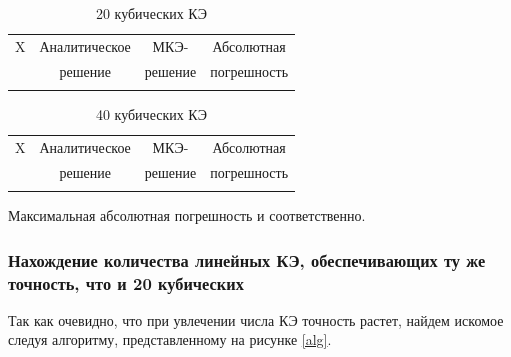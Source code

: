 \begin{table}[H]
\centering
\begin{tabular}{|c|c|c|c|}
\hline
X & Аналитическое & МКЭ-    & Абсолютная \\
  & решение       & решение & погрешность \\
\hline
 \\
\hline
\end{tabular}
\caption{20 кубических КЭ}
\label{table:lin_20}
\end{table}

\begin{table}[H]
\centering
\begin{tabular}{|c|c|c|c|}
\hline
X & Аналитическое & МКЭ-    & Абсолютная \\
  & решение       & решение & погрешность \\
\hline
 \\
\hline
\end{tabular}
\caption{40 кубических КЭ}
\label{table:lin_40}
\end{table}

Максимальная абсолютная погрешность  и  соответственно.


\subsubsection{Нахождение количества линейных КЭ, обеспечивающих ту же точность, что и 20 кубических}

Так как очевидно, что при увлечении числа КЭ точность растет, найдем искомое следуя алгоритму, представленному на рисунке \ref{alg}.

